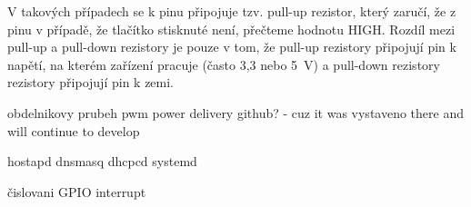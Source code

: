 V takových případech se k pinu připojuje tzv. pull-up rezistor, který zaručí, že z pinu v případě, že tlačítko stisknuté není, přečteme hodnotu HIGH.
Rozdíl mezi pull-up a pull-down rezistory je pouze v tom, že pull-up rezistory připojují pin k napětí, na kterém zařízení pracuje (často 3,3 nebo 5~V) a pull-down rezistory rezistory připojují pin k zemi.~\cite{sparkfun-pud}


obdelnikovy prubeh
pwm
power delivery
github? - cuz it was vystaveno there and will continue to develop

hostapd dnsmasq dhcpcd systemd

čislovani GPIO
interrupt